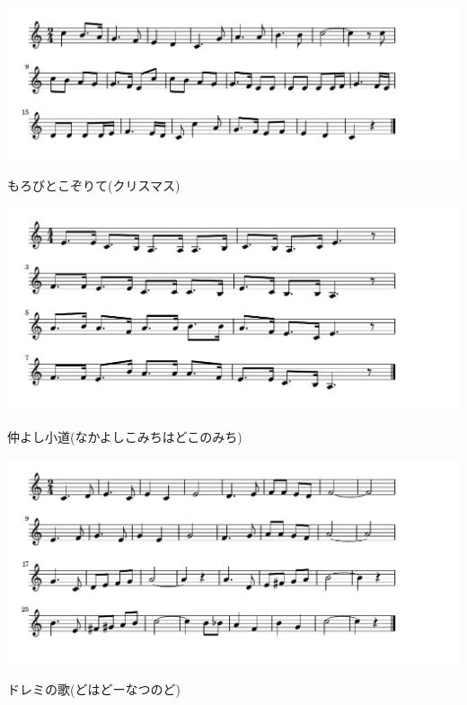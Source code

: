 \documentclass[a4paper]{ltjsarticle}
\begin{document}
\includegraphics[clip]{morobito_crop.pdf}

\vspace{-10mm} \hspace{10mm}
もろびとこぞりて(クリスマス)

\includegraphics[clip]{nakayoshikomichi_crop.pdf}

\vspace{-10mm} \hspace{10mm}
仲よし小道(なかよしこみちはどこのみち)

\includegraphics[clip]{doreminouta_crop.pdf}

\vspace{-10mm} \hspace{10mm}
ドレミの歌(どはどーなつのど)
\end{document}
